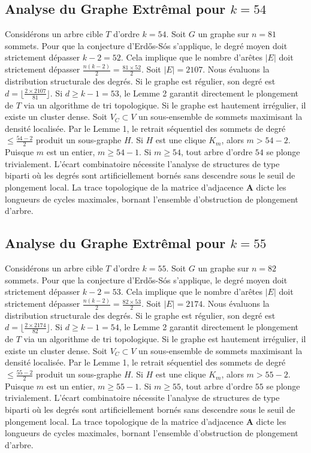 \documentclass[11pt,a4paper]{article}
\begin{document}
\subsection{Analyse du Graphe Extr\^emal pour $k=54$}
Consid\'erons un arbre cible $T$ d'ordre $k=54$.
Soit $G$ un graphe sur $n=81$ sommets.
Pour que la conjecture d'Erd\H{o}s-S\'os s'applique, le degr\'e moyen doit strictement d\'epasser $k-2 = 52$.
Cela implique que le nombre d'ar\^etes $|E|$ doit strictement d\'epasser $\frac{n(k-2)}{2} = \frac{81 \times 52}{2}$.
Soit $|E| = 2107$.
Nous \'evaluons la distribution structurale des degr\'es. Si le graphe est r\'egulier, son degr\'e est $d = \lfloor \frac{2 \times 2107}{81} \rfloor$.
Si $d \geq k-1 = 53$, le Lemme 2 garantit directement le plongement de $T$ via un algorithme de tri topologique.
Si le graphe est hautement irr\'egulier, il existe un cluster dense. Soit $V_C \subset V$ un sous-ensemble de sommets maximisant la densit\'e localis\'ee.
Par le Lemme 1, le retrait s\'equentiel des sommets de degr\'e $\leq \frac{54-2}{2}$ produit un sous-graphe $H$.
Si $H$ est une clique $K_{m}$, alors $m > 54-2$. Puisque $m$ est un entier, $m \geq 54-1$. Si $m \geq 54$, tout arbre d'ordre $54$ se plonge trivialement.
L'\'ecart combinatoire n\'ecessite l'analyse de structures de type biparti o\`u les degr\'es sont artificiellement born\'es sans descendre sous le seuil de plongement local. La trace topologique de la matrice d'adjacence $\mathbf{A}$ dicte les longueurs de cycles maximales, bornant l'ensemble d'obstruction de plongement d'arbre.


\subsection{Analyse du Graphe Extr\^emal pour $k=55$}
Consid\'erons un arbre cible $T$ d'ordre $k=55$.
Soit $G$ un graphe sur $n=82$ sommets.
Pour que la conjecture d'Erd\H{o}s-S\'os s'applique, le degr\'e moyen doit strictement d\'epasser $k-2 = 53$.
Cela implique que le nombre d'ar\^etes $|E|$ doit strictement d\'epasser $\frac{n(k-2)}{2} = \frac{82 \times 53}{2}$.
Soit $|E| = 2174$.
Nous \'evaluons la distribution structurale des degr\'es. Si le graphe est r\'egulier, son degr\'e est $d = \lfloor \frac{2 \times 2174}{82} \rfloor$.
Si $d \geq k-1 = 54$, le Lemme 2 garantit directement le plongement de $T$ via un algorithme de tri topologique.
Si le graphe est hautement irr\'egulier, il existe un cluster dense. Soit $V_C \subset V$ un sous-ensemble de sommets maximisant la densit\'e localis\'ee.
Par le Lemme 1, le retrait s\'equentiel des sommets de degr\'e $\leq \frac{55-2}{2}$ produit un sous-graphe $H$.
Si $H$ est une clique $K_{m}$, alors $m > 55-2$. Puisque $m$ est un entier, $m \geq 55-1$. Si $m \geq 55$, tout arbre d'ordre $55$ se plonge trivialement.
L'\'ecart combinatoire n\'ecessite l'analyse de structures de type biparti o\`u les degr\'es sont artificiellement born\'es sans descendre sous le seuil de plongement local. La trace topologique de la matrice d'adjacence $\mathbf{A}$ dicte les longueurs de cycles maximales, bornant l'ensemble d'obstruction de plongement d'arbre.
\end{document}
